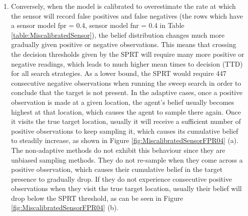 \begin{enumerate}
    \item Conversely, when the model is calibrated to overestimate the rate at which the sensor will record false positives and false negatives (the rows which have a sensor model fpr = 0.4, sensor model fnr = 0.4 in Table \ref{table:MiscalibratedSensor}), the belief distribution changes much more gradually given positive or negative observations. This means that crossing the decision thresholds given by the SPRT will require many more positive or negative readings, which leads to much higher mean times to decision (TTD) for all search strategies. As a lower bound, the SPRT would require 447 consecutive negative observations when running the sweep search in order to conclude that the target is not present. In the adaptive cases, once a positive observation is made at a given location, the agent's belief usually becomes highest at that location, which causes the agent to sample there again. Once it visits the true target location, usually it will receive a sufficient number of positive observations to keep sampling it, which causes its cumulative belief to steadily increase, as shown in Figure \ref{fig:MiscalibratedSensorFPR04} (a). The non-adaptive methods do not exhibit this behaviour since they are unbiased sampling methods. They do not re-sample when they come across a positive observation, which causes their cumulative belief in the target presence to gradually drop. If they do not experience consecutive positive observations when they visit the true target location, usually their belief will drop below the SPRT threshold, as can be seen in Figure \ref{fig:MiscalibratedSensorFPR04} (b).
\end{enumerate}